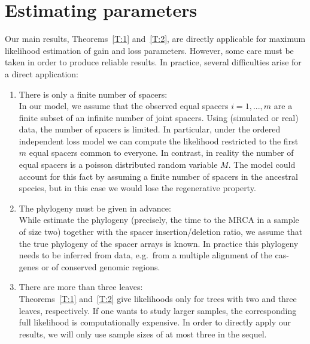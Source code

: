 \documentclass[preprint,authoryear]{elsarticle}
\theoremstyle{definition}
\numberwithin{equation}{section}
\numberwithin{figure}{section}
\begin{document}
\section{Estimating parameters} 
\label{S:4}
Our main results, Theorems~\ref{T:1} and~\ref{T:2}, are directly
applicable for maximum likelihood estimation of gain and loss
parameters. However, some care must be taken in order to produce
reliable results. In practice, several difficulties arise for a direct
application:
\begin{enumerate}
\item There is only a finite number of spacers:\\
  In our model, we assume that the observed equal spacers $i=1,...,m$
  are a finite subset of an infinite number of joint spacers. Using
  (simulated or real) data, the number of spacers is limited.
  In particular, under the ordered independent loss model we can compute 
  the likelihood restricted to the first $m$ equal spacers common to everyone.
  In contrast, in reality the number of equal spacers is a poisson distributed random variable $M$.
  The model could account for this fact by assuming a finite number of spacers in the ancestral species, but 
  in this case we would lose the regenerative property.
\item The phylogeny must be given in advance:\\
  While \cite{Kupczok2013} estimate the phylogeny (precisely, the time
  to the MRCA in a sample of size two) together with the spacer
  insertion/deletion ratio, we assume that the true phylogeny of
  the spacer arrays is known. In practice this phylogeny needs to be
  inferred from data, e.g.\ from a multiple alignment of the cas-genes
  or of conserved genomic regions.
\item There are more than three leaves:\\
  Theorems~\ref{T:1} and~\ref{T:2} give likelihoods only for trees
  with two and three leaves, respectively. If one wants to study
  larger samples, the corresponding full likelihood is computationally
  expensive.
  In order to directly
  apply our results, we will only use sample sizes of at most three in
  the sequel. 
\end{enumerate}
\end{document}
